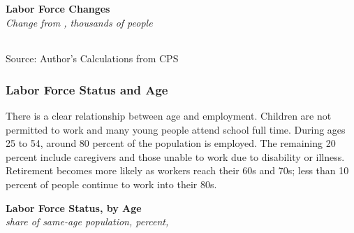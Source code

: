 \documentclass{report}
\newcommand{\abar}[4]{
		\addplot[stack plots=y, area style, draw=none, fill=#1] 
			table [x=#2, y=#3, col sep=comma]{#4}\closedcycle;}
\newcommand{\stdnode}[3]{\node[below, align=left, shift=({#1,#2})]{#3};}
\begin{document}
{\begin{minipage}{0.76\textwidth}
\normalsize \textbf{Labor Force Changes}\\
\footnotesize{\textit{Change from \unskip, thousands of people}}\\
\noindent {} \setlength{\tabcolsep}{3.0pt} \color{black!90}
		{\renewcommand{\arraystretch}{1.5}
\hspace*{-1mm} \begin{tabular}{p{28.5mm} R{11.2mm} R{10.4mm} R{10.4mm} R{10.2mm} 
		 				 R{10.6mm} R{10.4mm} R{10.4mm}}
			  \hline
		\end{tabular}}
		\vspace{-3mm}
		
\footnotesize{Source: Author's Calculations from CPS}
\end{minipage}
\newpage
\begin{minipage}{0.76\textwidth}
\subsubsection*{Labor Force Status and Age} 
\small There is a clear relationship between age and employment. Children are not permitted to work and many young people attend school full time. During ages 25 to 54, around 80 percent of the population is employed. The remaining 20 percent include caregivers and those unable to work due to disability or illness. Retirement becomes more likely as workers reach their 60s and 70s; less than 10 percent of people continue to work into their 80s. 
\vspace{1mm}

\normalsize \textbf{Labor Force Status, by Age}\\
\footnotesize{\textit{share of same-age population, percent, }}\\
\hspace*{-3mm} 
\vspace{-1mm}


\end{minipage}}
\end{document}
